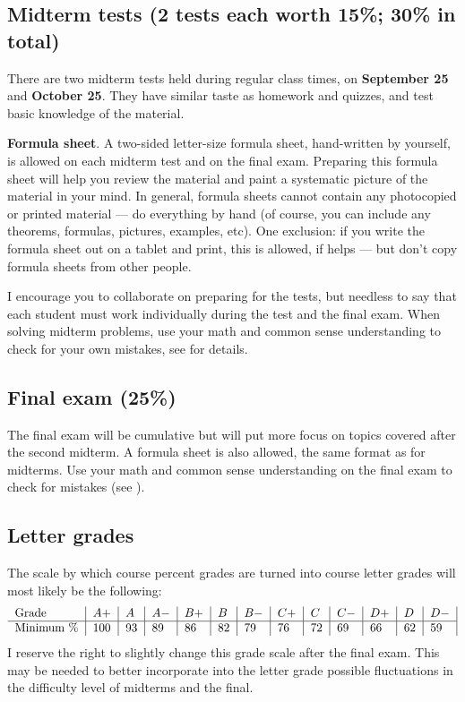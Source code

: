 \documentclass[oneside,11pt]{amsart}
\begin{document}
\subsection{Midterm tests (2 tests each worth 15\%; 30\% in total)}

There are two midterm tests
held
during regular class times, on \textbf{September 25} and \textbf{October 25}.
They have
similar taste as homework and quizzes, and test basic knowledge of the material.

\textbf{Formula sheet}.
A two-sided letter-size formula sheet, hand-written by yourself, is allowed on each midterm test and on the final exam. Preparing this formula sheet will help you review the material and paint a systematic picture of the material in your mind. In general, formula sheets cannot contain any photocopied or printed material --- do everything by hand (of course, you can include any theorems, formulas, pictures, examples, etc). One exclusion: if you write the formula sheet out on a tablet and print, this is allowed, if helps --- but don't copy formula sheets from other people.

I encourage you to collaborate on preparing for the tests, but needless to say that each student must work individually during the test and the final exam.
When solving midterm problems, use your math and common sense understanding to check for your own mistakes,
see  for details.


\subsection{Final exam (25\%)}

The final exam will be cumulative but will put more focus on topics covered after the second midterm. A formula sheet is also allowed, the same format as for midterms. Use your math and common sense understanding on the final exam to check for mistakes (see ).


\subsection*{Letter grades}

The scale by which course percent grades are turned into course letter grades
will most likely be the following:
\begin{equation*}
	\begin{tabular}{l|l|l|l|l|l|l|l|l|l|l|l|l|}
		Grade      & $ A+	$ & $A	$ & $A-	$ & $B+	$ & $B	$ & $B-	$ & $C+	$ & $C	$ & $C-	$ & $D+	$ & $D	$ & $D-$ \\
		\hline
		Minimum \% & 100     & 93   & 89    & 86    & 82    & 79    & 76    & 72    & 69    & 66    & 62    & 59
	\end{tabular}
\end{equation*}
I reserve the right to slightly change this grade scale after the
final exam.
This may be needed
to better incorporate into the letter grade
possible fluctuations in the difficulty level of 
midterms and the final.
\end{document}
